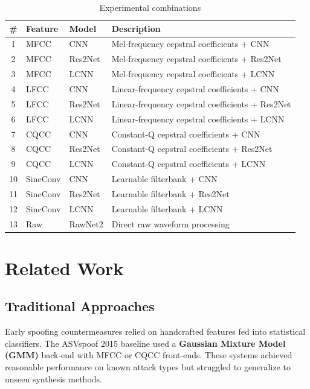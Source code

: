 \documentclass[12pt]{report}
\begin{document}
\begin{table}[h!]
\centering
\caption{Experimental combinations}
\label{tab:combos}
\begin{tabularx}{0.92\textwidth}{cllX}
\toprule
\textbf{\#} & \textbf{Feature} & \textbf{Model} & \textbf{Description} \\
\midrule
1  & MFCC     & CNN      & Mel-frequency cepstral coefficients + CNN \\
2  & MFCC     & Res2Net  & Mel-frequency cepstral coefficients + Res2Net \\
3  & MFCC     & LCNN     & Mel-frequency cepstral coefficients + LCNN \\
4  & LFCC     & CNN      & Linear-frequency cepstral coefficients + CNN \\
5  & LFCC     & Res2Net  & Linear-frequency cepstral coefficients + Res2Net \\
6  & LFCC     & LCNN     & Linear-frequency cepstral coefficients + LCNN \\
7  & CQCC     & CNN      & Constant-Q cepstral coefficients + CNN \\
8  & CQCC     & Res2Net  & Constant-Q cepstral coefficients + Res2Net \\
9  & CQCC     & LCNN     & Constant-Q cepstral coefficients + LCNN \\
10 & SincConv & CNN      & Learnable filterbank + CNN \\
11 & SincConv & Res2Net  & Learnable filterbank + Res2Net \\
12 & SincConv & LCNN     & Learnable filterbank + LCNN \\
13 & Raw      & RawNet2  & Direct raw waveform processing \\
\bottomrule
\end{tabularx}
\end{table}


\chapter{Related Work}

\section{Traditional Approaches}

Early spoofing countermeasures relied on handcrafted features fed into statistical classifiers.
The ASVspoof 2015 baseline used a \textbf{Gaussian Mixture Model (GMM)} back-end with MFCC or
CQCC front-ends. These systems achieved reasonable performance on known attack types but
struggled to generalize to unseen synthesis methods.
\end{document}
